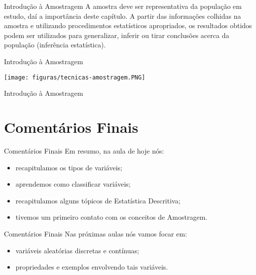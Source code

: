 \documentclass[10pt]{beamer}
\renewcommand{\indent}{\hspace*{2em}}
\theoremstyle{definition}
\begin{document}
\begin{frame}{Introdução à Amostragem}
\indent A amostra deve ser representativa da população em estudo, daí a importância deste capítulo. A partir das informações colhidas na amostra e utilizando procedimentos estatísticos apropriados, os resultados obtidos podem ser utilizados para generalizar, inferir ou tirar conclusões acerca da população (inferência estatística).
\end{frame}

\begin{frame}{Introdução à Amostragem}
 \begin{center}
  \texttt{[image: figuras/tecnicas-amostragem.PNG]}
 \end{center}
\end{frame}

\begin{frame}{Introdução à Amostragem}
\indent 
\end{frame}



\section{Comentários Finais}

\begin{frame}{Comentários Finais}
\indent Em resumo, na aula de hoje nós:
\begin{itemize}
    \item recapitulamos os tipos de variáveis;
    \item aprendemos como classificar variáveis;
    \item recapitulamos alguns tópicos de Estatística Descritiva;
    \item tivemos um primeiro contato com os conceitos de Amostragem.
\end{itemize}
\end{frame}

\begin{frame}{Comentários Finais}
\indent Nas próximas aulas nós vamos focar em:
\begin{itemize}
    \item variáveis aleatórias discretas e contínuas;
    \item propriedades e exemplos envolvendo tais variáveis.
\end{itemize}
\end{frame}
\end{document}
